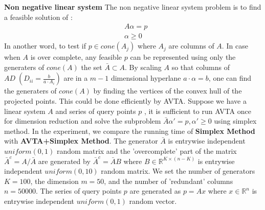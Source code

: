\documentclass[]{article}
\begin{document}
	\noindent\textbf{ Non negative linear system} The non negative linear system problem is to find a feasible solution of :\\
		\begin{equation}
	\begin{aligned}
	&  A\alpha=p\\ 
	& \alpha\geq0\;\;
	\end{aligned}
	\end{equation}
	In another word, to test if $p \in cone(A_j)$ where $A_j$ are columns of $A$. In case when $A$ is over complete,  any feasible $p$ can be represented using only the generaters of $cone(A)$ the set $\bar{A} \subset A$. By scaling $A$ so that columns of $AD\; (D_{ii}= \frac{b}{a\cdot A_i})$ are in a  $m-1$ dimensional hyperlane $a\cdot \alpha =b$, one can find the generaters of $cone(A)$ by finding the vertices of the convex hull of the projected points. This could be done efficiently by AVTA. 
	Suppose we have a linear system $A$ and series of query points $p$ , it is sufficient to run AVTA once for dimension reduction and solve the subproblem $\bar{A}\alpha'=p, \alpha' \geq0$ using simplex method. In the experiment, we compare the running time of \textbf{Simplex Method} with \textbf{AVTA+Simplex Method}. The generator $\bar{A}$ is entrywise independent $uniform(0,1)$ random matrix and the 'overcomplete' part of the matrix $\bar{A}^c=A/\bar{A}$ are generated by $\bar{A}^c=\bar{A}B$ where $B\in \mathbb{R}^{ K \times (n-K)}$ is entrywise independent $uniform(0,10)$ random matrix. We set the number of generators $K=100$, the dimension $m=50$, and the number of 'redundant' columns $n=50000$. The series of query points $p$ are generated as $p=Ax$ where $x\in \mathbb{R}^{n}$ is entrywise independent $uniform(0,1)$ random vector. 
	
	
\end{document}
